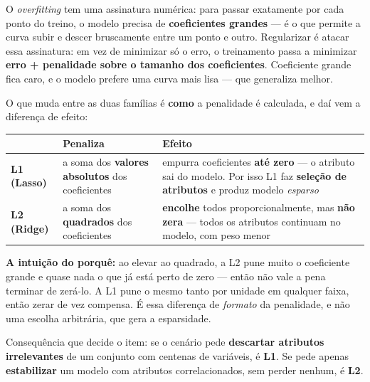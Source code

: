 \begin{conceito}
O \emph{overfitting} tem uma assinatura numérica: para passar exatamente por
cada ponto do treino, o modelo precisa de \textbf{coeficientes grandes} --- é
o que permite a curva subir e descer bruscamente entre um ponto e outro.
Regularizar é atacar essa assinatura: em vez de minimizar só o erro, o
treinamento passa a minimizar \textbf{erro + penalidade sobre o tamanho dos
coeficientes}. Coeficiente grande fica caro, e o modelo prefere uma curva mais
lisa --- que generaliza melhor.

O que muda entre as duas famílias é \textbf{como} a penalidade é calculada, e
daí vem a diferença de efeito:

\begin{center}
\begin{tabular}{@{}p{2.4cm}p{3.6cm}p{5.4cm}@{}}
\toprule
& \textbf{Penaliza} & \textbf{Efeito} \\
\midrule
\textbf{L1 (Lasso)} & a soma dos \textbf{valores absolutos} dos coeficientes &
empurra coeficientes \textbf{até zero} --- o atributo sai do modelo. Por isso
L1 faz \textbf{seleção de atributos} e produz modelo \emph{esparso} \\
\textbf{L2 (Ridge)} & a soma dos \textbf{quadrados} dos coeficientes &
\textbf{encolhe} todos proporcionalmente, mas \textbf{não zera} --- todos os
atributos continuam no modelo, com peso menor \\
\bottomrule
\end{tabular}
\end{center}

\textbf{A intuição do porquê:} ao elevar ao quadrado, a L2 pune muito o
coeficiente grande e quase nada o que já está perto de zero --- então não vale
a pena terminar de zerá-lo. A L1 pune o mesmo tanto por unidade em qualquer
faixa, então zerar de vez compensa. É essa diferença de \emph{formato} da
penalidade, e não uma escolha arbitrária, que gera a esparsidade.

Consequência que decide o item: se o cenário pede \textbf{descartar atributos
irrelevantes} de um conjunto com centenas de variáveis, é \textbf{L1}. Se pede
apenas \textbf{estabilizar} um modelo com atributos correlacionados, sem
perder nenhum, é \textbf{L2}.
\end{conceito}

